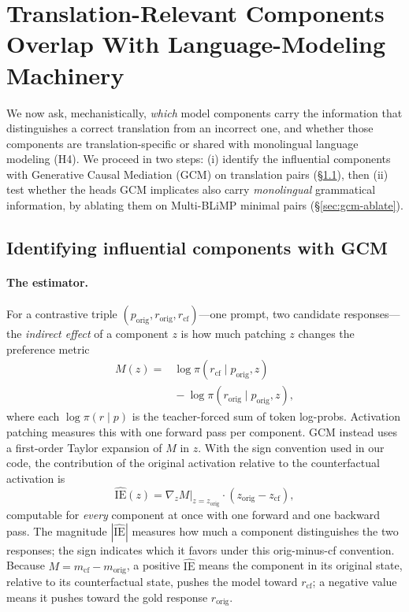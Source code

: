 \documentclass[11pt]{article}
\begin{document}
\section{Translation-Relevant Components Overlap With Language-Modeling Machinery}
\label{sec:gcm}

We now ask, mechanistically, \emph{which} model components carry the information
that distinguishes a correct translation from an incorrect one, and whether
those components are translation-specific or shared with monolingual language
modeling (H4). We proceed in two steps: (i) identify the influential components
with Generative Causal Mediation (GCM) on translation pairs
(\S\ref{sec:gcm-id}), then (ii) test whether the heads GCM implicates also carry
\emph{monolingual} grammatical information, by ablating them on Multi-BLiMP
minimal pairs (\S\ref{sec:gcm-ablate}).

\subsection{Identifying influential components with GCM}
\label{sec:gcm-id}

\paragraph{The estimator.} For a contrastive triple $(p_{\text{orig}},
r_{\text{orig}}, r_{\text{cf}})$---one prompt, two candidate responses---the
\emph{indirect effect} of a component $z$ is how much patching $z$ changes the
preference metric
\begin{equation}
\begin{aligned}
M(z) ={}& \log \pi(r_{\text{cf}}\mid p_{\text{orig}}, z) \\
&{}- \log \pi(r_{\text{orig}}\mid p_{\text{orig}}, z),
\end{aligned}
\end{equation}
where each $\log\pi(r\mid p)$ is the teacher-forced sum of token log-probs.
Activation patching measures this with one forward pass per component. GCM
\citep{sankaranarayanan2026gcm} instead uses a first-order Taylor expansion of
$M$ in $z$. With the sign convention used in our code, the contribution of the
original activation relative to the counterfactual activation is
\begin{equation}
\widehat{\mathrm{IE}}(z) = \nabla_z M\big|_{z=z_{\text{orig}}} \cdot (z_{\text{orig}} - z_{\text{cf}}),
\label{eq:ie}
\end{equation}
computable for \emph{every} component at once with one forward and one backward
pass. The magnitude $|\widehat{\mathrm{IE}}|$ measures how much a component
distinguishes the two responses; the sign indicates which it favors under this
orig-minus-cf convention. Because $M = m_{\text{cf}} - m_{\text{orig}}$, a
positive $\widehat{\mathrm{IE}}$ means the component in its original state,
relative to its counterfactual state, pushes the model toward $r_{\text{cf}}$;
a negative value means it pushes toward the gold response $r_{\text{orig}}$.
\end{document}
